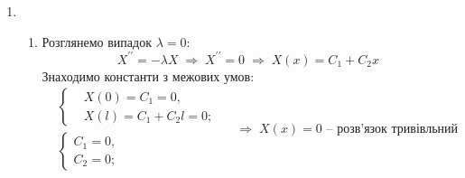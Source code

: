 \documentclass[a4paper, 14pt]{extreport}
\begin{document}
\begin{enumerate}
    \item[] \begin{enumerate}
        \item Розглянемо випадок $\lambda = 0$:
        \begin{equation*}
            X^{\prime\prime} = -\lambda X
            \;\Rightarrow\;
            X^{\prime\prime} = 0
            \;\Rightarrow\;
            X(x) = C_1 + C_2 x
        \end{equation*}
        Знаходимо константи з межових умов:
        \begin{equation*}
            \begin{aligned}
                &\left\{ \begin{aligned}
                    &X(0) = C_1 = 0, \\ 
                    &X(l) = C_1 + C_2 l = 0;
                \end{aligned} \right.
                \\   
                &\left\{ \begin{aligned}
                    C_1 = 0, \\ 
                    C_2 = 0;
                \end{aligned} \right.
            \end{aligned}
            \quad\Rightarrow\;
            X(x) = 0 \text{ -- розв'язок тривівльний}
        \end{equation*}
    

\end{enumerate}
\end{enumerate}
\end{document}
